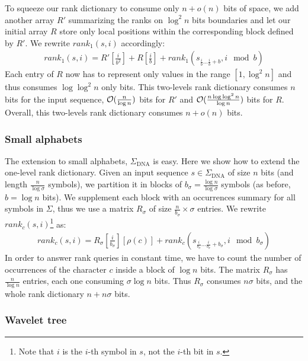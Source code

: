 To squeeze our rank dictionary to consume only $n+o(n)$ bits of space, we add another array $R'$ summarizing the ranks on $\log^2{n}$ bits boundaries and let our initial array $R$ store only local positions within the corresponding block defined by $R'$.
We rewrite $rank_1(s,i)$ accordingly:
\begin{eqnarray}
rank_1(s,i) = R'[\frac{i}{b^2}] + R[\frac{i}{b}] + rank_1(s_{\frac{i}{b} \dots \frac{i}{b}+b}, i \mod{b})
\end{eqnarray}
Each entry of $R$ now has to represent only values in the range $[1,\log^2{n}]$ and thus consumes $\log{\log^2{n}}$ only bits.
This two-levels rank dictionary consumes $n$ bits for the input sequence, $\mathcal{O}(\frac{n}{\log{n}})$ bits for $R'$ and $\mathcal{O}(\frac{n \log{\log^2{n}}}{\log{n}})$ bits for $R$.
Overall, this two-levels rank dictionary consumes $n + o(n)$ bits.

\subsubsection{Small alphabets}

The extension to small alphabets, \eg $\Sigma_{\text{DNA}}$ is easy.
Here we show how to extend the one-level rank dictionary.
Given an input sequence $s \in \Sigma_{\text{DNA}}$ of size $n$ bits (and length $\frac{n}{\log{\sigma}}$ symbols), we partition it in blocks of $b_{\sigma}=\frac{\log{n}}{\log{\sigma}}$ symbols (as before, $b=\log{n}$ bits).
We supplement each block with an occurrences summary for all symbols in $\Sigma$, thus we use a matrix $R_{\sigma}$ of size $\frac{n}{b_{\sigma}} \times \sigma$ entries.
We rewrite $rank_c(s,i)$\footnote{Note that $i$ is the $i$-th symbol in $s$, not the $i$-th bit in $s$.} as:
\begin{eqnarray}
rank_c(s,i) = R_{\sigma}[\frac{i}{b_{\sigma}}][\rho(c)] + rank_c(s_{\frac{i}{b_{\sigma}} \dots \frac{i}{b_{\sigma}}+b_{\sigma}}, i \mod{b_{\sigma}})
\end{eqnarray}
In order to answer rank queries in constant time, we have to count the number of occurrences of the character $c$ inside a block of $\log{n}$ bits.
The matrix $R_{\sigma}$ has $\frac{n}{\log{n}}$ entries, each one consuming $\sigma \log{n}$ bits. Thus $R_{\sigma}$ consumes $n \sigma$ bits, and the whole rank dictionary $n + n \sigma$ bits.

\subsubsection{Wavelet tree}

